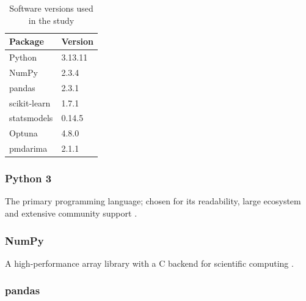 \begin{table}[h!]
    \centering
    \caption{Software versions used in the study}
    \label{tab:software-versions}
    \begin{tabular}{|l|l|}
        \hline
        \textbf{Package} & \textbf{Version} \\
        \hline
        \hline
        Python & 3.13.11 \\
        \hline
        NumPy & 2.3.4 \\
        \hline
        pandas & 2.3.1 \\
        \hline
        scikit‑learn & 1.7.1 \\
        \hline
        statsmodels & 0.14.5 \\
        \hline
        Optuna & 4.8.0 \\
        \hline
        pmdarima & 2.1.1 \\
        \hline
    \end{tabular}
\end{table}

\subsubsection*{Python 3}


The primary programming language; chosen for its readability, large ecosystem and extensive community support \cite{python}.

\subsubsection*{NumPy}


A high‑performance array library with a C backend for scientific computing \cite{numpy}.

\subsubsection*{pandas}

